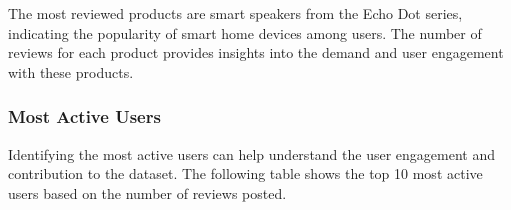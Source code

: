 \documentclass[11pt,a4paper,openany,oneside,titlepage]{article}
\begin{document}

The most reviewed products are smart speakers from the Echo Dot series, indicating the popularity of smart home devices among users. The number of reviews for each product provides insights into the demand and user engagement with these products.

\subsubsection{Most Active Users}

Identifying the most active users can help understand the user engagement and contribution to the dataset. The following table shows the top 10 most active users based on the number of reviews posted.
\end{document}
